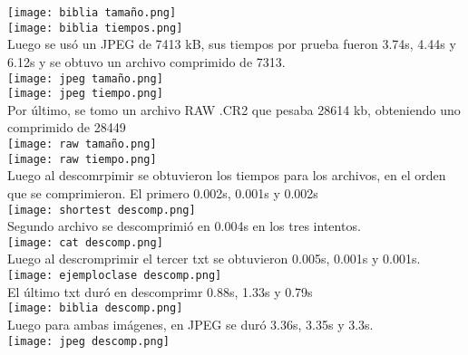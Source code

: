 \documentclass[12pt, article, natbib]{IEEEtran}
\begin{document}
\texttt{[image: biblia tamaño.png]}\\
\texttt{[image: biblia tiempos.png]}\\

Luego se usó un JPEG de 7413 kB, sus tiempos por prueba fueron 3.74s, 4.44s y 6.12s y se obtuvo un archivo comprimido de 7313.\\

\texttt{[image: jpeg tamaño.png]}\\
\texttt{[image: jpeg tiempo.png]}\\

Por último, se tomo un archivo RAW .CR2 que pesaba 28614 kb, obteniendo uno comprimido de 28449\\

\texttt{[image: raw tamaño.png]}\\
\texttt{[image: raw tiempo.png]}\\

Luego al descomrpimir se obtuvieron los tiempos para los archivos, en el orden que se comprimieron. El primero 0.002s, 0.001s y 0.002s\\

\texttt{[image: shortest descomp.png]}\\

Segundo archivo se descomprimió en 0.004s en los tres intentos.\\

\texttt{[image: cat descomp.png]}\\

Luego al descromprimir el tercer txt se obtuvieron 0.005s, 0.001s y 0.001s.\\

\texttt{[image: ejemploclase descomp.png]}\\

El último txt duró en descomprimr 0.88s, 1.33s y 0.79s\\

\texttt{[image: biblia descomp.png]}\\

Luego para ambas imágenes, en JPEG se duró 3.36s, 3.35s y 3.3s.\\

\texttt{[image: jpeg descomp.png]}\\
\end{document}
